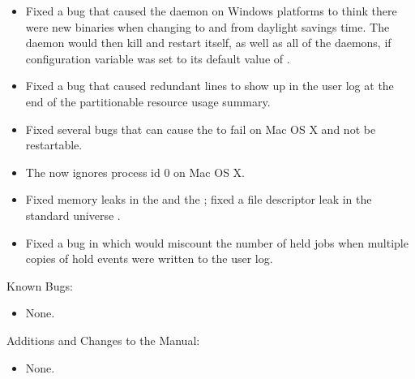 \begin{itemize}
\item Fixed a bug that caused the  daemon on Windows platforms
to think there were new binaries
when changing to and from daylight savings time.
The  daemon would then kill and restart itself,
as well as all of the daemons,
if configuration variable  was set
to its default value of .

\item Fixed a bug that caused redundant lines to show up in the user log
at the end of the partitionable resource usage summary.

\item Fixed several bugs that can cause the  to fail on Mac OS X
and not be restartable.

\item The  now ignores process id 0 on Mac OS X.

\item Fixed memory leaks in the  and the ;
fixed a file descriptor leak in the standard universe .

\item Fixed a bug in which  would miscount the number
of held jobs when
multiple copies of hold events were written to the user log.

\end{itemize}

\noindent Known Bugs:

\begin{itemize}

\item None.

\end{itemize}

\noindent Additions and Changes to the Manual:

\begin{itemize}

\item None.

\end{itemize}


